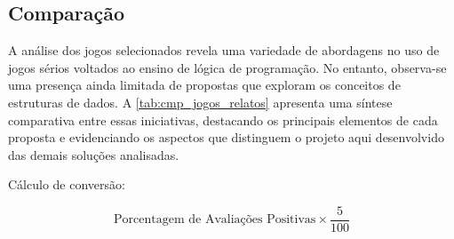 \subsection{Comparação}

A análise dos jogos selecionados revela uma variedade de abordagens no uso de jogos sérios voltados ao ensino de lógica de programação. No entanto, observa-se uma presença ainda limitada de propostas que exploram os conceitos de estruturas de dados. A \autoref{tab:cmp_jogos_relatos} apresenta uma síntese comparativa entre essas iniciativas, destacando os principais elementos de cada proposta e evidenciando os aspectos que distinguem o projeto aqui desenvolvido das demais soluções analisadas.





Cálculo de conversão:

\[
	\text{Porcentagem de Avaliações Positivas} \times \frac{5}{100}
\]

